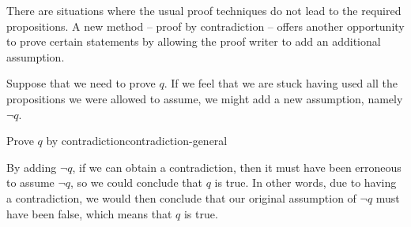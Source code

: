 \documentclass{book}
\theoremstyle{ekimcustom}
\begin{document}
There are situations where the usual proof techniques do not lead to the required propositions. A new method -- proof by contradiction -- offers another opportunity to prove certain statements by allowing the proof writer to add an additional assumption.

Suppose that we need to prove $q$. If we feel that we are stuck having used all the propositions we were allowed to assume, we might add a new assumption, namely $\neg q$.
\begin{bmethod}{Prove $q$ by contradiction}{contradiction-general}
\begin{center}
\end{center}
\end{bmethod}
By adding $\neg q$, if we can obtain a contradiction, then it must have been erroneous to assume $\neg q$, so we could conclude that $q$ is true. In other words, due to having a contradiction, we would then conclude that our original assumption of $\neg q$ must have been false, which means that $q$ is true.
\end{document}
